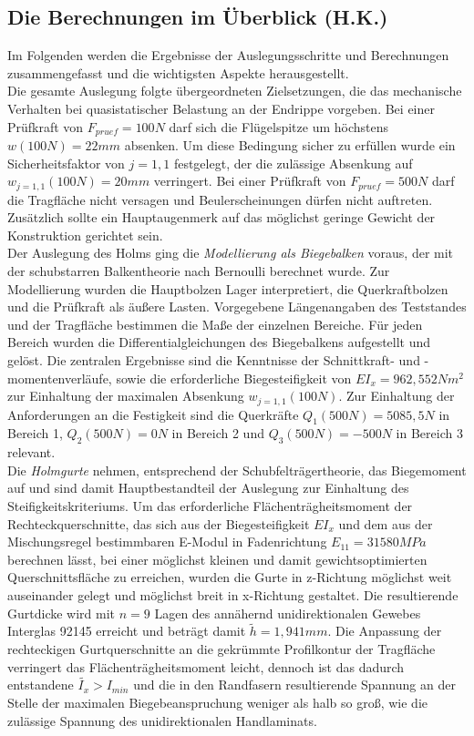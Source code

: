 \subsection{Die Berechnungen im Überblick (H.K.)}
Im Folgenden werden die Ergebnisse der Auslegungsschritte und Berechnungen zusammengefasst und die wichtigsten Aspekte herausgestellt.\\

\noindent Die gesamte Auslegung folgte übergeordneten Zielsetzungen, die das mechanische Verhalten bei quasistatischer Belastung an der Endrippe vorgeben. Bei einer Prüfkraft von $ F_{pruef}=100N $ darf sich die Flügelspitze um höchstens $ w(100N)=22mm $ absenken. Um diese Bedingung sicher zu erfüllen wurde ein Sicherheitsfaktor von $ j=1,1 $ festgelegt, der die zulässige Absenkung auf $ w_{j=1,1}(100N)=20mm $ verringert. Bei einer Prüfkraft von $ F_{pruef}=500N $ darf die Tragfläche nicht versagen und Beulerscheinungen dürfen nicht auftreten. Zusätzlich sollte ein Hauptaugenmerk auf das möglichst geringe Gewicht der Konstruktion gerichtet sein.\\

\noindent Der Auslegung des Holms ging die \textit{Modellierung als Biegebalken} voraus, der mit der schubstarren Balkentheorie nach Bernoulli berechnet wurde. Zur Modellierung wurden die Hauptbolzen Lager interpretiert, die Querkraftbolzen und die Prüfkraft als äußere Lasten. Vorgegebene Längenangaben des Teststandes und der Tragfläche bestimmen die Maße der einzelnen Bereiche. Für jeden Bereich wurden die Differentialgleichungen des Biegebalkens aufgestellt und gelöst. Die zentralen Ergebnisse sind die Kenntnisse der Schnittkraft- und -momentenverläufe, sowie die erforderliche Biegesteifigkeit von $ EI_{x}=962,552Nm^{2} $ zur Einhaltung der maximalen Absenkung $ w_{j=1,1}(100N) $. Zur Einhaltung der Anforderungen an die Festigkeit sind die Querkräfte $ Q_{1}(500N)=5085,5N $ in Bereich 1, $ Q_{2}(500N)=0N $ in Bereich 2 und $ Q_{3}(500N)=-500N $ in Bereich 3 relevant.\\

\noindent Die \textit{Holmgurte} nehmen, entsprechend der Schubfelträgertheorie, das Biegemoment auf und sind damit Hauptbestandteil der Auslegung zur Einhaltung des Steifigkeitskriteriums. Um das erforderliche Flächenträgheitsmoment der Rechteckquerschnitte, das sich aus der Biegesteifigkeit $ EI_{x} $ und dem aus der Mischungsregel bestimmbaren E-Modul in Fadenrichtung $ E_{11}=31580MPa $ berechnen lässt, bei einer möglichst kleinen und damit gewichtsoptimierten Querschnittsfläche zu erreichen, wurden die Gurte in z-Richtung möglichst weit auseinander gelegt und möglichst breit in x-Richtung gestaltet. Die resultierende Gurtdicke wird mit $ n=9 $ Lagen des annähernd unidirektionalen Gewebes Interglas 92145 erreicht und beträgt damit $ \tilde{h}=1,941mm $. Die Anpassung der rechteckigen Gurtquerschnitte an die gekrümmte Profilkontur der Tragfläche verringert das Flächenträgheitsmoment leicht, dennoch ist das dadurch entstandene $ \tilde{I_{x}}>I_{min} $ und die in den Randfasern resultierende Spannung an der Stelle der maximalen Biegebeanspruchung weniger als halb so groß, wie die zulässige Spannung des unidirektionalen Handlaminats.\\

